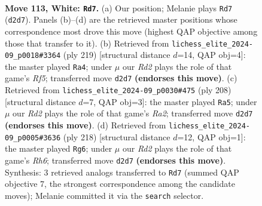 \documentclass[11pt]{article}
\begin{document}
\clearpage

\begin{figure}[p]\centering
\begin{subfigure}{0.46\textwidth}\centering
\resizebox{\linewidth}{!}{%
\newchessgame
\chessboard[
  setfen={5k2/8/4p3/4P3/5PR1/8/3R1K2/7r w - - 11 113},
  showmover=false,
  pgfstyle=straightmove, color=movearrow, markmove={d2-d7}
]}
\caption{}
\end{subfigure}\hfill
\begin{subfigure}{0.46\textwidth}\centering
\resizebox{\linewidth}{!}{%
\newchessgame
\chessboard[
  setfen={8/8/5kp1/7p/5r1P/8/4K3/7R b - - 81 110},
  showmover=false,
  pgfstyle=straightmove, color=movearrow, markmove={f4-a4}
]}
\caption{}
\end{subfigure}
\\[4pt]
\begin{subfigure}{0.46\textwidth}\centering
\resizebox{\linewidth}{!}{%
\newchessgame
\chessboard[
  setfen={8/6k1/8/7p/7P/6P1/R5K1/1r6 w - - 55 105},
  showmover=false,
  pgfstyle=straightmove, color=movearrow, markmove={a2-a5}
]}
\caption{}
\end{subfigure}\hfill
\begin{subfigure}{0.46\textwidth}\centering
\resizebox{\linewidth}{!}{%
\newchessgame
\chessboard[
  setfen={8/1r6/5P1R/6p1/6P1/6k1/8/4K3 w - - 0 110},
  showmover=false,
  pgfstyle=straightmove, color=movearrow, markmove={h6-g6}
]}
\caption{}
\end{subfigure}
\caption{\textbf{Move 113, White: \texttt{Rd7}.} (a) Our position; Melanie plays \texttt{Rd7} (\texttt{d2d7}). Panels (b)--(d) are the retrieved master positions whose correspondence most drove this move (highest QAP objective among those that transfer to it). (b) Retrieved from \texttt{lichess\_elite\_2024-09\_p0018\#3364} (ply 219) [structural distance $d$=14, QAP obj=4]: the master played \texttt{Ra4}; under $\mu$ our \emph{Rd2} plays the role of that game's \emph{Rf5}; transferred move \texttt{d2d7} \textbf{(endorses this move)}. (c) Retrieved from \texttt{lichess\_elite\_2024-09\_p0030\#475} (ply 208) [structural distance $d$=7, QAP obj=3]: the master played \texttt{Ra5}; under $\mu$ our \emph{Rd2} plays the role of that game's \emph{Ra2}; transferred move \texttt{d2d7} \textbf{(endorses this move)}. (d) Retrieved from \texttt{lichess\_elite\_2024-09\_p0005\#3636} (ply 218) [structural distance $d$=12, QAP obj=1]: the master played \texttt{Rg6}; under $\mu$ our \emph{Rd2} plays the role of that game's \emph{Rh6}; transferred move \texttt{d2d7} \textbf{(endorses this move)}. Synthesis: 3 retrieved analogs transferred to \texttt{Rd7} (summed QAP objective 7, the strongest correspondence among the candidate moves); Melanie committed it via the \texttt{search} selector.}
\label{fig:thought-m224}
\end{figure}
\end{document}

